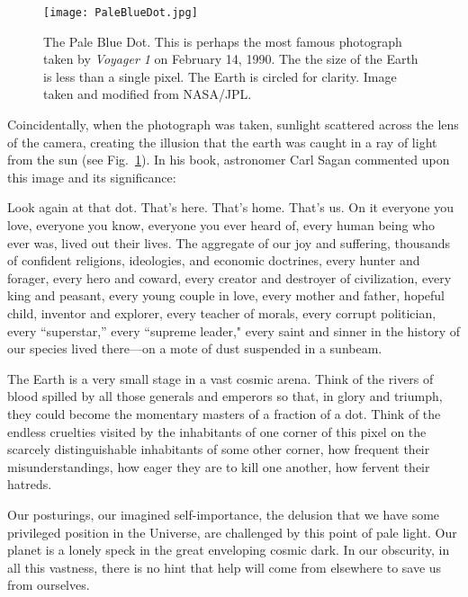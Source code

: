     \begin{figure}[ht]
    \centering
\texttt{[image: PaleBlueDot.jpg]}

        \caption{The Pale Blue Dot. This is perhaps the most famous photograph taken by \emph{Voyager 1} on February 14, 1990. The the size of the Earth is less than a single pixel. The Earth is circled for clarity. Image taken and modified from NASA/JPL.}
        \label{fig:pale_blue_dot}
    \end{figure}

    Coincidentally, when the photograph was taken, sunlight scattered across the lens of the camera, creating the illusion that the earth was caught in a ray of light from the sun (see  Fig.~\ref{fig:pale_blue_dot}). In his book, astronomer Carl Sagan commented upon this image and its significance:
    \begin{displayquote}
        \small %
        \quad Look again at that dot. That's here. That's home. That's us. On it everyone you love, everyone you know, everyone you ever heard of, every human being who ever was, lived out their lives. The aggregate of our joy and suffering, thousands of confident religions, ideologies, and economic doctrines, every hunter and forager, every hero and coward, every creator and destroyer of civilization, every king and peasant, every young couple in love, every mother and father, hopeful child, inventor and explorer, every teacher of morals, every corrupt politician, every ``superstar,'' every ``supreme leader," every saint and sinner in the history of our species lived there---on a mote of dust suspended in a sunbeam.

        \quad The Earth is a very small stage in a vast cosmic arena. Think of the rivers of blood spilled by all those generals and emperors so that, in glory and triumph, they could become the momentary masters of a fraction of a dot. Think of the endless cruelties visited by the inhabitants of one corner of this pixel on the scarcely distinguishable inhabitants of some other corner, how frequent their misunderstandings, how eager they are to kill one another, how fervent their hatreds.

        \quad Our posturings, our imagined self-importance, the delusion that we have some privileged position in the Universe, are challenged by this point of pale light. Our planet is a lonely speck in the great enveloping cosmic dark. In our obscurity, in all this vastness, there is no hint that help will come from elsewhere to save us from ourselves.


\end{displayquote}
